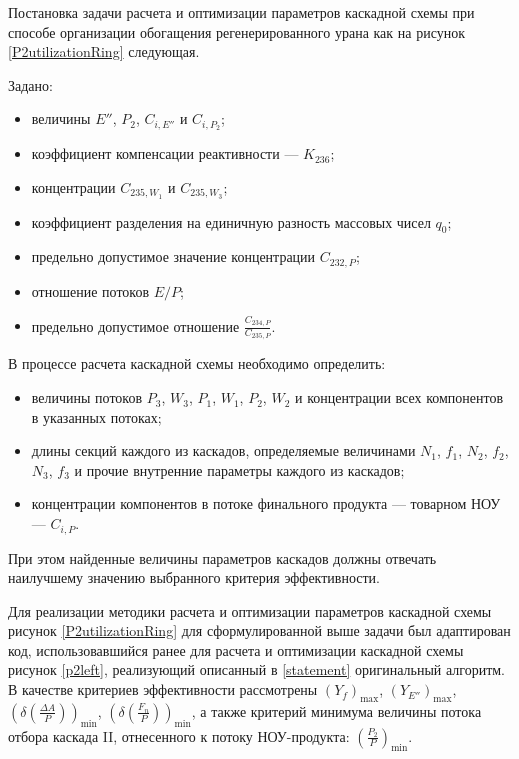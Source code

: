 Постановка задачи расчета и оптимизации параметров каскадной схемы при способе организации обогащения регенерированного урана как на рисунок \ref{P2utilizationRing} следующая.

Задано:

\begin{itemize}
    \item величины $E''$, $P_2$, $C_{i,E''}$ и $C_{i,{P_2}}$; 
    \item коэффициент компенсации реактивности --- $K_{236}$;
    \item концентрации $C_{235,{W_1}}$ и $C_{235,{W_3}}$;
    \item коэффициент разделения на единичную разность массовых чисел $q_{0}$;
    \item предельно допустимое значение концентрации $C_{232,{P}}$;
    \item отношение потоков ${E}/P$;
    \item предельно допустимое отношение $\frac{C_{234,{P}}}{C_{235,{P}}}$. 
\end{itemize}

В процессе расчета каскадной схемы необходимо определить:

\begin{itemize}
    \item величины потоков $P_3$, $W_3$, $P_1$, $W_1$, $P_2$, $W_2$ и концентрации всех компонентов в указанных потоках; 
    \item длины секций каждого из каскадов, определяемые величинами $N_1$, $f_1$, $N_2$, $f_2$, $N_3$, $f_3$ и прочие внутренние параметры каждого из каскадов;
    \item концентрации компонентов в потоке финального продукта --- товарном НОУ --- $C_{i,P}$.
\end{itemize}

При этом найденные величины параметров каскадов должны отвечать наилучшему значению выбранного критерия эффективности.  

Для реализации методики расчета и оптимизации параметров каскадной схемы рисунок \ref{P2utilizationRing} для сформулированной выше задачи был адаптирован код, использовавшийся ранее для расчета и оптимизации каскадной схемы рисунок \ref{p2left}, реализующий описанный в \ref{statement} оригинальный алгоритм. В качестве критериев эффективности рассмотрены $(Y_f)_\text{max}$, $(Y_{E''})_\text{max}$, $(\delta(\frac{\Delta A}{P}))_\text{min}$, $(\delta(\frac{F_n}{P}))_\text{min}$, а также критерий минимума величины потока отбора каскада II, отнесенного к потоку НОУ-продукта:  $(\frac{P_2}{P})_\text{min}$.     

